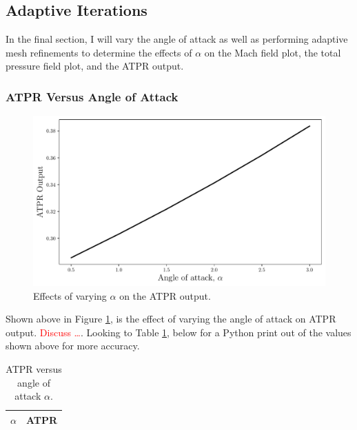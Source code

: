 \pagebreak
\subsection{Adaptive Iterations}

In the final section, I will vary the angle of attack as well as performing adaptive mesh refinements to determine the effects of $\alpha$ on the Mach field plot, the total pressure field plot, and the ATPR output. 

\subsubsection{ATPR Versus Angle of Attack}
\begin{figure}[h]
    \centering
    \includegraphics[width = 0.9\linewidth]{rep/q5/ATPR.pdf}
    \caption[ATPR and Angle of Attack]{Effects of varying $\alpha$ on the ATPR output.}
    \label{fig:aoa_ATPR}
\end{figure}

Shown above in Figure \ref{fig:aoa_ATPR}, is the effect of varying the angle of attack on ATPR output. \textcolor{red}{Discuss \ldots}. Looking to Table \ref{tab:ATPR_alpha}, below for a Python print out of the values shown above for more accuracy.

\begin{table}[h]
    \centering
    \caption[ATPR Versus Angle of Attack]{ATPR versus angle of attack $\alpha$.}
    \label{tab:ATPR_alpha}
    \begin{tabular}{l|l}
        $\alpha$ & ATPR\\ \hline\hline
        
    \end{tabular}
\end{table}

